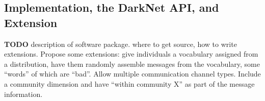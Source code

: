 \documentclass{article}
\begin{document}
\subsection*{Implementation, the DarkNet API, and Extension}
{\bf TODO} description of software package.  where to get source, how to write extensions.  Propose some extensions: give individuals a vocabulary assigned from a distribution, have them randomly assemble messages from the vocabulary, some ``words'' of which are ``bad''.  Allow multiple communication channel types.  Include a community dimension and have ``within community X'' as part of the message information.


\newpage


\end{document}
